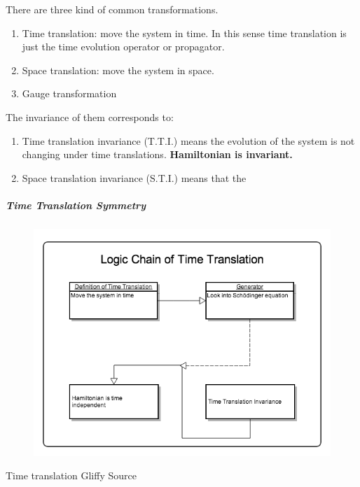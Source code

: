 \documentclass[letterpaper,10pt,english]{sphinxmanual}
\begin{document}
There are three kind of common transformations.
\begin{enumerate}
\item {} 
Time translation: move the system in time. In this sense time translation is just the time evolution operator or propagator.

\item {} 
Space translation: move the system in space.

\item {} 
Gauge transformation

\end{enumerate}

The invariance of them corresponds to:
\begin{enumerate}
\item {} 
Time translation invariance (T.T.I.) means the evolution of the system is not changing under time translations. \textbf{Hamiltonian is invariant.}

\item {} 
Space translation invariance (S.T.I.) means that the

\end{enumerate}


\subparagraph{Time Translation Symmetry}
\label{Quantum/symmetries:time-translation-symmetry}\begin{figure}[htbp]
\centering

\includegraphics{TimeTranslation.png}
\end{figure}

Time translation Gliffy Source
\end{document}
